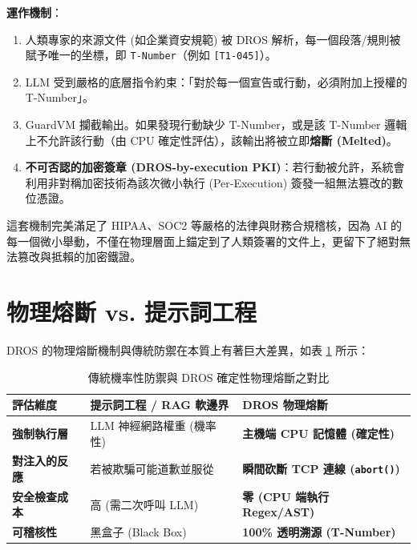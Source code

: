 \documentclass[conference]{IEEEtran}
\begin{document}
\textbf{運作機制}：
\begin{enumerate}
    \item 人類專家的來源文件 (如企業資安規範) 被 DROS 解析，每一個段落/規則被賦予唯一的坐標，即 \texttt{T-Number}（例如 \texttt{[T1-045]}）。
    \item LLM 受到嚴格的底層指令約束：「對於每一個宣告或行動，必須附加上授權的 T-Number」。
    \item GuardVM 攔截輸出。如果發現行動缺少 T-Number，或是該 T-Number 邏輯上不允許該行動（由 CPU 確定性評估），該輸出將被立即\textbf{熔斷 (Melted)}。
    \item \textbf{不可否認的加密簽章 (DROS-by-execution PKI)}：若行動被允許，系統會利用非對稱加密技術為該次微小執行 (Per-Execution) 簽發一組無法篡改的數位憑證。
\end{enumerate}

這套機制完美滿足了 HIPAA、SOC2 等嚴格的法律與財務合規稽核，因為 AI 的每一個微小舉動，不僅在物理層面上錨定到了人類簽署的文件上，更留下了絕對無法篡改與抵賴的加密鐵證。

\section{物理熔斷 vs. 提示詞工程}
DROS 的物理熔斷機制與傳統防禦在本質上有著巨大差異，如表 \ref{tab1} 所示：

\begin{table}[htbp]
\caption{傳統機率性防禦與 DROS 確定性物理熔斷之對比}
\begin{center}
\begin{tabular}{|p{2cm}|p{2.5cm}|p{2.5cm}|}
\hline
\textbf{評估維度} & \textbf{提示詞工程 / RAG 軟邊界} & \textbf{DROS 物理熔斷} \\
\hline
\textbf{強制執行層} & LLM 神經網路權重 (機率性) & \textbf{主機端 CPU 記憶體 (確定性)} \\
\hline
\textbf{對注入的反應} & 若被欺騙可能道歉並服從 & \textbf{瞬間砍斷 TCP 連線 (\texttt{abort()})} \\
\hline
\textbf{安全檢查成本} & 高 (需二次呼叫 LLM) & \textbf{零 (CPU 端執行 Regex/AST)} \\
\hline
\textbf{可稽核性} & 黑盒子 (Black Box) & \textbf{100\% 透明溯源 (T-Number)} \\
\hline
\end{tabular}
\label{tab1}
\end{center}
\end{table}
\end{document}
